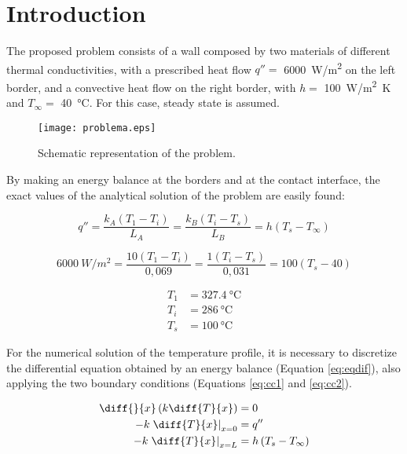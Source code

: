 \section{Introduction}

The proposed problem consists of a wall composed by two materials of different thermal conductivities, with a prescribed heat flow $q'' =$ \SI{6000}{W/m^2} on the left border, and a convective heat flow on the right border, with $h =$ \SI{100}{W/m^2.K} and $T_\infty =$ \SI{40}{\celsius}.
For this case, steady state is assumed.

\begin{figure}[h]
    \centering
    \texttt{[image: problema.eps]}
    \caption{Schematic representation of the problem.}
    \label{fig:problema}
\end{figure}

By making an energy balance at the borders and at the contact interface, the exact values of the analytical solution of the problem are easily found:

\begin{equation*}
    q'' = \frac{k_A \left(T_1 - T_i \right)}{L_A} = \frac{k_B \left(T_i - T_s \right)}{L_B} = h \left(T_s - T_\infty \right)
\end{equation*}

\begin{equation*}
    \SI{6000}{W/m^2} =
    \frac{10 \left(T_1 - T_i \right)}{0,069} =
    \frac{1  \left(T_i - T_s \right)}{0,031} =
    100 \left(T_s - 40 \right)
\end{equation*}

\begin{align*}
    T_1 &= \SI{327.4}{\celsius} \\
    T_i &= \SI{286}{\celsius} \\
    T_s &= \SI{100}{\celsius}
\end{align*}

For the numerical solution of the temperature profile, it is necessary to discretize the differential equation obtained by an energy balance (Equation \ref{eq:eqdif}), also applying the two boundary conditions (Equations \ref{eq:cc1} and \ref{eq:cc2}).

\begin{align} 
    \diff{}{x} \left( k \diff{T}{x} \right) &= 0 \label{eq:eqdif} \\
    -k \left. \diff{T}{x} \right|_{x = 0} &= q'' \label{eq:cc1} \\
    -k \left. \diff{T}{x}\right|_{x = L} &= h \left(T_s - T_\infty \right) \label{eq:cc2}
\end{align}

